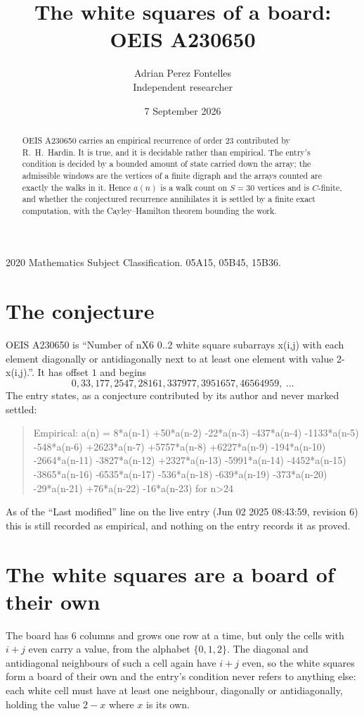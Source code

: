 \documentclass[11pt,a4paper]{article}
\title{The white squares of a board: OEIS A230650}
\author{Adrian Perez Fontelles\\ \small Independent researcher}
\date{7 September 2026}
\theoremstyle{plain}
\theoremstyle{definition}
\begin{document}
\maketitle

\begin{abstract}
OEIS A230650 carries an empirical recurrence of order $23$ contributed by R.~H.~Hardin. It is
true, and it is decidable rather than empirical. The entry's condition is decided by a bounded amount of state carried down the array; the
admissible windows are the vertices of a finite digraph and the arrays counted are exactly the
walks in it. Hence $a(n)$ is a walk count on $S=30$ vertices and is $C$-finite, and whether the
conjectured recurrence annihilates it is settled by a finite exact computation, with the
Cayley--Hamilton theorem bounding the work.
\end{abstract}

\noindent\small 2020 Mathematics Subject Classification. 05A15, 05B45, 15B36.\normalsize

\section{The conjecture}

OEIS A230650 is ``Number of nX6 0..2 white square subarrays x(i,j) with each element diagonally or antidiagonally next to at least one element with value 2-x(i,j).''. It has offset $1$ and begins
\[
0, 33, 177, 2547, 28161, 337977, 3951657, 46564959,\ \dots
\]
The entry states, as a conjecture contributed by its author and never marked settled:
\begin{quote}
Empirical: a(n) = 8*a(n-1) +50*a(n-2) -22*a(n-3) -437*a(n-4) -1133*a(n-5) -548*a(n-6) +2623*a(n-7) +5757*a(n-8) +6227*a(n-9) -194*a(n-10) -2664*a(n-11) -3827*a(n-12) +2327*a(n-13) -5991*a(n-14) -4452*a(n-15) -3865*a(n-16) -6535*a(n-17) -536*a(n-18) -639*a(n-19) -373*a(n-20) -29*a(n-21) +76*a(n-22) -16*a(n-23) for n>24
\end{quote}
As of the ``Last modified'' line on the live entry (Jun 02 2025 08:43:59, revision 6) this is still
recorded as empirical, and nothing on the entry records it as proved.

\section{The white squares are a board of their own}

The board has $6$ columns and grows one row at a time, but only the cells with $i+j$ even carry a value, from the alphabet $\{0,1,2\}$. The diagonal and antidiagonal neighbours of such a cell again have $i+j$ even, so the white squares form a board of their own and the entry's condition never refers to anything else: each white cell must have at least one neighbour, diagonally or antidiagonally, holding the value $2-x$ where $x$ is its own.
\end{document}
